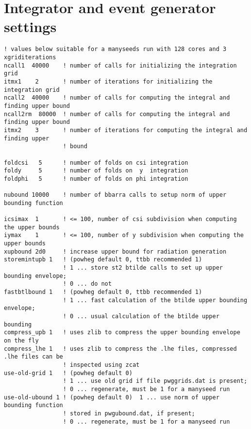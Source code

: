 \section{Integrator and event generator settings }
\begin{lstlisting}[basicstyle=\ttfamily\scriptsize,frame = single]
! values below suitable for a manyseeds run with 128 cores and 3 xgriditerations
ncall1  40000    ! number of calls for initializing the integration grid
itmx1    2       ! number of iterations for initializing the integration grid
ncall2  40000    ! number of calls for computing the integral and finding upper bound
ncall2rm  80000  ! number of calls for computing the integral and finding upper bound
itmx2    3       ! number of iterations for computing the integral and finding upper
                 ! bound

foldcsi   5      ! number of folds on csi integration
foldy     5      ! number of folds on  y  integration
foldphi   5      ! number of folds on phi integration

nubound 10000    ! number of bbarra calls to setup norm of upper bounding function

icsimax  1       ! <= 100, number of csi subdivision when computing the upper bounds
iymax    1       ! <= 100, number of y subdivision when computing the upper bounds
xupbound 2d0     ! increase upper bound for radiation generation
storemintupb 1   ! (powheg default 0, ttbb recommended 1) 
                 ! 1 ... store st2 btilde calls to set up upper bounding envelope;
                 ! 0 ... do not 
fastbtlbound 1   ! (powheg default 0, ttbb recommended 1) 
                 ! 1 ... fast calculation of the btilde upper bounding envelope;
                 ! 0 ... usual calculation of the btilde upper bounding
compress_upb 1   ! uses zlib to compress the upper bounding envelope on the fly
compress_lhe 1   ! uses zlib to compress the .lhe files, compressed .lhe files can be 
                 ! inspected using zcat
use-old-grid 1   ! (powheg default 0) 
                 ! 1 ... use old grid if file pwggrids.dat is present;
                 ! 0 ... regenerate, must be 1 for a manyseed run
use-old-ubound 1 ! (powheg default 0)  1 ... use norm of upper bounding function 
                 ! stored in pwgubound.dat, if present;
                 ! 0 ... regenerate, must be 1 for a manyseed run
\end{lstlisting}
